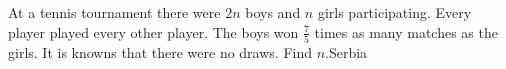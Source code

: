 At a tennis tournament there were $2n$ boys and $n$ girls participating. Every player played every other player. The boys won $\frac 75$ times as many matches as the girls. It is knowns that there were no draws. Find $n$.Serbia